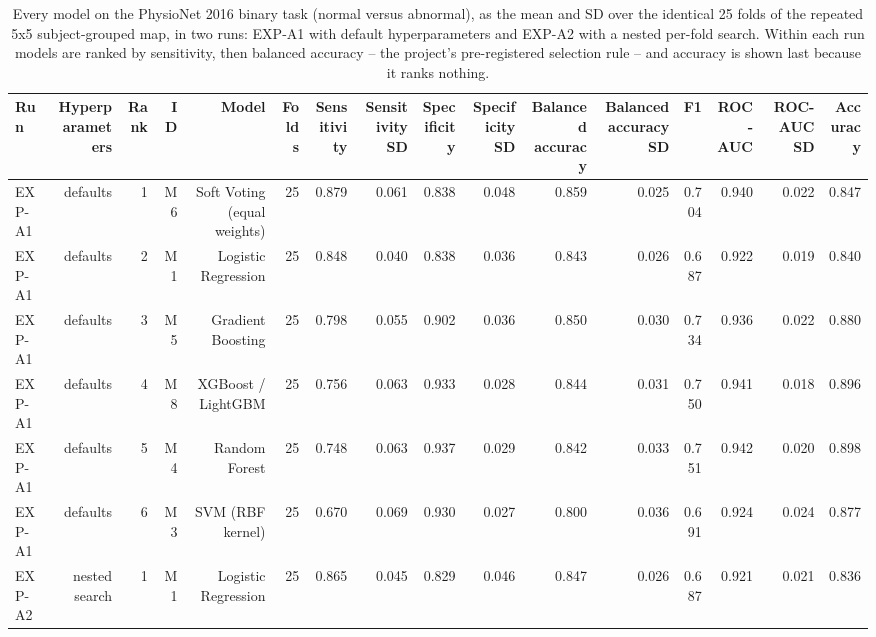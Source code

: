 \begin{table}[htbp]
  \centering
  \caption{Every model on the PhysioNet 2016 binary task (normal versus abnormal), as the mean and SD over the identical 25 folds of the repeated 5x5 subject-grouped map, in two runs: EXP-A1 with default hyperparameters and EXP-A2 with a nested per-fold search. Within each run models are ranked by sensitivity, then balanced accuracy -- the project's pre-registered selection rule -- and accuracy is shown last because it ranks nothing.}
  \label{tab:t08}
  \begin{tabular}{lrrrrrrrrrrrrrrr}
    \toprule
    Run & Hyperparameters & Rank & ID & Model & Folds & Sensitivity & Sensitivity SD & Specificity & Specificity SD & Balanced accuracy & Balanced accuracy SD & F1 & ROC-AUC & ROC-AUC SD & Accuracy \\
    \midrule
    EXP-A1 & defaults & 1 & M6 & Soft Voting (equal weights) & 25 & 0.879 & 0.061 & 0.838 & 0.048 & 0.859 & 0.025 & 0.704 & 0.940 & 0.022 & 0.847 \\
    EXP-A1 & defaults & 2 & M1 & Logistic Regression & 25 & 0.848 & 0.040 & 0.838 & 0.036 & 0.843 & 0.026 & 0.687 & 0.922 & 0.019 & 0.840 \\
    EXP-A1 & defaults & 3 & M5 & Gradient Boosting & 25 & 0.798 & 0.055 & 0.902 & 0.036 & 0.850 & 0.030 & 0.734 & 0.936 & 0.022 & 0.880 \\
    EXP-A1 & defaults & 4 & M8 & XGBoost / LightGBM & 25 & 0.756 & 0.063 & 0.933 & 0.028 & 0.844 & 0.031 & 0.750 & 0.941 & 0.018 & 0.896 \\
    EXP-A1 & defaults & 5 & M4 & Random Forest & 25 & 0.748 & 0.063 & 0.937 & 0.029 & 0.842 & 0.033 & 0.751 & 0.942 & 0.020 & 0.898 \\
    EXP-A1 & defaults & 6 & M3 & SVM (RBF kernel) & 25 & 0.670 & 0.069 & 0.930 & 0.027 & 0.800 & 0.036 & 0.691 & 0.924 & 0.024 & 0.877 \\
    EXP-A2 & nested search & 1 & M1 & Logistic Regression & 25 & 0.865 & 0.045 & 0.829 & 0.046 & 0.847 & 0.026 & 0.687 & 0.921 & 0.021 & 0.836 \\

\end{tabular}
\end{table}
